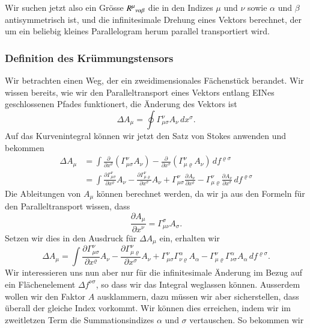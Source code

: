 Wir suchen jetzt also ein Grösse $R^\mu\mathstrut_{\nu\alpha\beta}$
die in den Indizes $\mu$ und $\nu$ sowie $\alpha$ und $\beta$
antisymmetrisch ist, und die infinitesimale Drehung eines Vektors
berechnet, der um ein beliebig kleines Parallelogram herum parallel
transportiert wird.

\subsubsection{Definition des Krümmungstensors}
Wir betrachten einen Weg, der ein zweidimensionales Fächenstück berandet.
Wir wissen bereits, wie wir den Paralleltransport eines Vektors entlang
EINes geschlossenen Pfades funktionert, die Änderung des Vektors ist
\[
\Delta A_\mu
= 
\oint \Gamma_{\mu\sigma}^\nu A_\nu\,dx^\sigma.
\]
Auf das Kurvenintegral können wir jetzt den Satz von Stokes anwenden
und bekommen
\begin{align*}
\Delta A_\mu
&=
\int
\frac{\partial}{\partial x^\varrho}
(\Gamma_{\mu\sigma}^\nu A_\nu)
-
\frac{\partial}{\partial x^\sigma}
(\Gamma_{\mu\varrho}^\nu A_\nu)
\,df^{\varrho\sigma}
\\
&=\int
\frac{\partial \Gamma_{\mu\sigma}^\nu}{\partial x^\varrho}A_\nu
-
\frac{\partial \Gamma_{\mu\varrho}^\nu}{\partial x^\sigma}A_\nu
+
\Gamma_{\mu\sigma}^\nu
\frac{\partial A_\nu}{\partial x^\varrho}
-
\Gamma_{\mu\varrho}^\nu
\frac{\partial A_\nu}{\partial x^\sigma}
\,df^{\varrho\sigma}
\end{align*}
Die Ableitungen von $A_\mu$ können berechnet werden, da wir ja aus
den Formeln für den Paralleltransport wissen, dass
\[
\frac{\partial A_\mu}{\partial x^\nu}=\Gamma^{\sigma}_{\mu\nu}A_\sigma.
\]
Setzen wir dies in den Ausdruck für $\Delta A_\mu$ ein, erhalten
wir
\begin{equation}
\Delta A_\mu
=\int
\frac{\partial \Gamma_{\mu\sigma}^\nu}{\partial x^\varrho}A_\nu
-
\frac{\partial \Gamma_{\mu\varrho}^\nu}{\partial x^\sigma}A_\nu
+
\Gamma_{\mu\sigma}^\nu
\Gamma_{\nu\varrho}^\alpha
A_\alpha
-
\Gamma_{\mu\varrho}^\nu
\Gamma_{\nu\sigma}^\alpha
A_\alpha
\,df^{\varrho\sigma}.
\end{equation}
Wir interessieren uns nun aber nur für die infinitesimale Änderung
im Bezug auf ein Flächenelement $\Delta f^{\nu\sigma}$, so dass wir
das Integral weglassen können.
Ausserdem wollen wir den Faktor $A$ ausklammern, dazu müssen wir aber
sicherstellen, dass überall der gleiche Index vorkommt.
Wir können dies erreichen, indem wir im zweitletzen Term die
Summationsindizes $\alpha$ und $\sigma$ vertauschen.
So bekommen wir
